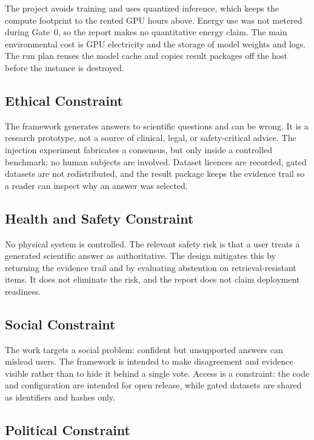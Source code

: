 The project avoids training and uses quantized inference, which keeps the compute footprint to the rented GPU hours above. Energy use was not metered during Gate~0, so the report makes no quantitative energy claim. The main environmental cost is GPU electricity and the storage of model weights and logs. The run plan reuses the model cache and copies result packages off the host before the instance is destroyed.

\subsection{Ethical Constraint}

The framework generates answers to scientific questions and can be wrong. It is a research prototype, not a source of clinical, legal, or safety-critical advice. The injection experiment fabricates a consensus, but only inside a controlled benchmark; no human subjects are involved. Dataset licences are recorded, gated datasets are not redistributed, and the result package keeps the evidence trail so a reader can inspect why an answer was selected.

\subsection{Health and Safety Constraint}

No physical system is controlled. The relevant safety risk is that a user treats a generated scientific answer as authoritative. The design mitigates this by returning the evidence trail and by evaluating abstention on retrieval-resistant items. It does not eliminate the risk, and the report does not claim deployment readiness.

\subsection{Social Constraint}

The work targets a social problem: confident but unsupported answers can mislead users. The framework is intended to make disagreement and evidence visible rather than to hide it behind a single vote. Access is a constraint: the code and configuration are intended for open release, while gated datasets are shared as identifiers and hashes only.

\subsection{Political Constraint}

